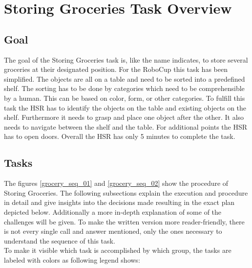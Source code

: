 \documentclass[main.tex]{subfiles}
\begin{document}
	
	\begingroup
	
	\renewcommand{\cleardoublepage}{}
	
	\renewcommand{\clearpage}{}
	
	\chapter{Storing Groceries Task Overview}
	\label{grocery-sequence}
	

	\section{Goal}
	The goal of the Storing Groceries task is, like the name indicates, to store several groceries at their designated position. For the RoboCup this task has been simplified. The objects are all on a table and need to be sorted into a predefined shelf. The sorting has to be done by categories which need to be comprehensible by a human. This can be based on color, form, or other categories. To fulfill this task the HSR has to identify the objects on the table and existing objects on the shelf. Furthermore it needs to grasp and place one object after the other. It also needs to navigate between the shelf and the table. For additional points the HSR has to open doors. Overall the HSR has only 5 minutes to complete the task. 

	\section{Tasks}
	The figures \ref{grocery_seq_01} and \ref{grocery_seq_02} show the procedure of Storing Groceries. The following subsections explain the execution and procedure in detail and give insights into the decisions made resulting in the exact plan depicted below. Additionally a more in-depth explanation of some of the challenges will be given. To make the written version more reader-friendly, there is not every single call and answer mentioned, only the ones necessary to understand the sequence of this task.\\
	To make it visible which task is accomplished by which group, the tasks are labeled with colors as following legend  shows:\\
	~\\
	
\end{document}

